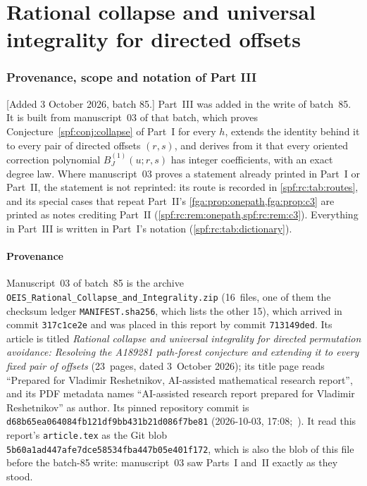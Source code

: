 \documentclass[11pt]{article}
\numberwithin{equation}{section}
\theoremstyle{definition}
\theoremstyle{remark}
\theoremstyle{definition}
\begin{document}
\part{Rational collapse and universal integrality for directed offsets}
\label{spf:rc:part}

\section{Provenance, scope and notation of Part III}
\label{spf:rc:sec:front}

[Added 3 October 2026, batch 85.] Part~III was added in the write of
batch~85. It is built from manuscript~03 of that batch, which proves
Conjecture~\ref{spf:conj:collapse} of Part~I for every $h$, extends the
identity behind it to every pair of directed offsets $(r,s)$, and derives
from it that every oriented correction polynomial $B_J^{(1)}(u;r,s)$ has
integer coefficients, with an exact degree law. Where manuscript~03 proves
a statement already printed in Part~I or Part~II, the statement is not
reprinted: its route is recorded in \cref{spf:rc:tab:routes}, and its
special cases that repeat Part~II's \cref{fga:prop:onepath,fga:prop:c3} are
printed as notes crediting Part~II (\cref{spf:rc:rem:onepath,spf:rc:rem:c3}).
Everything in Part~III is written in Part~I's notation
(\cref{spf:rc:tab:dictionary}).

\subsection{Provenance}
\label{spf:rc:sec:provenance}

Manuscript~03 of batch~85 is the archive
\nolinkurl{OEIS_Rational_Collapse_and_Integrality.zip} (16~files, one of
them the checksum ledger \texttt{MANIFEST.sha256}, which lists the other
15), which arrived in commit \texttt{317c1ce2e} and was placed in this
report by commit \texttt{713149ded}. Its article is titled
\emph{Rational collapse and universal integrality for directed permutation
avoidance: Resolving the A189281 path-forest conjecture and extending it to
every fixed pair of offsets} (23~pages, dated 3~October 2026); its title
page reads ``Prepared for Vladimir Reshetnikov, AI-assisted mathematical
research report'', and its PDF metadata names ``AI-assisted research report
prepared for Vladimir Reshetnikov'' as author. Its pinned repository commit
is \texttt{d68b65ea064084fb121df9bb431b21d086f7be81} (2026-10-03,
17:08;~\cite{rcProveIt}). It read this report's \texttt{article.tex} as the
Git blob \texttt{5b60a1ad447afe7dce58534fba447b05e401f172}, which is also
the blob of this file before the batch-85 write: manuscript~03 saw Parts~I
and~II exactly as they stood.
\end{document}
